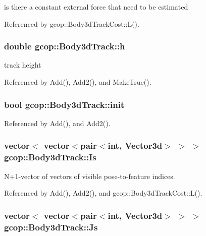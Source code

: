 is there a constant external force that need to be estimated 



\-Referenced by gcop\-::\-Body3d\-Track\-Cost\-::\-L().

\subsubsection[{h}]{\setlength{\rightskip}{0pt plus 5cm}double {\bf gcop\-::\-Body3d\-Track\-::h}}\label{classgcop_1_1Body3dTrack_ae57d1bcfe526aa8766f9fc4d77508c4d}


track height 



\-Referenced by \-Add(), \-Add2(), and \-Make\-True().

\subsubsection[{init}]{\setlength{\rightskip}{0pt plus 5cm}bool {\bf gcop\-::\-Body3d\-Track\-::init}}\label{classgcop_1_1Body3dTrack_a7f6829e4bfd2f2cf48267cf51ef89666}


\-Referenced by \-Add(), and \-Add2().

\subsubsection[{\-Is}]{\setlength{\rightskip}{0pt plus 5cm}vector$<$ vector$<$pair$<$int, \-Vector3d$>$ $>$ $>$ {\bf gcop\-::\-Body3d\-Track\-::\-Is}}\label{classgcop_1_1Body3dTrack_ab911b7b90354df99f88e04bef13e356e}


\-N+1-\/vector of vectors of visible pose-\/to-\/feature indices. 



\-Referenced by \-Add(), \-Add2(), and gcop\-::\-Body3d\-Track\-Cost\-::\-L().

\subsubsection[{\-Js}]{\setlength{\rightskip}{0pt plus 5cm}vector$<$ vector$<$pair$<$int, \-Vector3d$>$ $>$ $>$ {\bf gcop\-::\-Body3d\-Track\-::\-Js}}\label{classgcop_1_1Body3dTrack_acec7ca26f4414c74e3e4364480bf320b}


